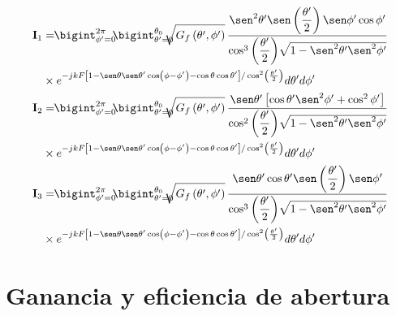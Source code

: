 \begin{subequations}
\label{grup_ec_principios:11}
\begin{align}
\begin{split}
\mathbf{I}_1 &= \!\!\bigint_{\phi ' = 0}^{2\pi}\!\!\bigint_{\theta ' = 0}^{\theta_0}\!\!\!\!\!\sqrt{G_f\left(\theta ',\phi '\right)}\,\dfrac{\sen^2\theta '\sen\left(\dfrac{\theta '}{2}\right)\sen\phi '\cos\phi '}{\cos^3\left(\dfrac{\theta '}{2}\right)\!\sqrt{1 - \sen^2\theta '\sen^2\phi '}}\\
&\times e^{-jkF\left[1 - \sen\theta\sen\theta '\cos\left(\phi - \phi '\right) - \cos\theta\cos\theta '\right]/\cos^2\left(\frac{\theta '}{2}\right)}d\theta 'd\phi '
\end{split}
\label{ec_principios:54}\\
\begin{split}
\mathbf{I}_2 &= \!\!\bigint_{\phi ' = 0}^{2\pi}\!\!\bigint_{\theta ' = 0}^{\theta_0}\!\!\!\!\!\sqrt{G_f\left(\theta ',\phi '\right)}\,\dfrac{\sen\theta '\left[\cos\theta '\sen^2\phi ' + \cos^2\phi '\right]}{\cos^2\left(\dfrac{\theta '}{2}\right)\!\sqrt{1 - \sen^2\theta '\sen^2\phi '}}\\
&\times e^{-jkF\left[1 - \sen\theta\sen\theta '\cos\left(\phi - \phi '\right) - \cos\theta\cos\theta '\right]/\cos^2\left(\frac{\theta '}{2}\right)}d\theta 'd\phi '
\end{split}
\label{ec_principios:55}\\
\begin{split}
\mathbf{I}_3 &= \!\!\bigint_{\phi ' = 0}^{2\pi}\!\!\bigint_{\theta ' = 0}^{\theta_0}\!\!\!\!\!\sqrt{G_f\left(\theta ',\phi '\right)}\,\dfrac{\sen\theta '\cos\theta '\sen\left(\dfrac{\theta '}{2}\right)\sen\phi '}{\cos^3\left(\dfrac{\theta '}{2}\right)\!\sqrt{1 - \sen^2\theta '\sen^2\phi '}}\\
&\times e^{-jkF\left[1 - \sen\theta\sen\theta '\cos\left(\phi - \phi '\right) - \cos\theta\cos\theta '\right]/\cos^2\left(\frac{\theta '}{2}\right)}d\theta 'd\phi '
\end{split}
\label{ec_principios:56}
\end{align}
\end{subequations}

\section{Ganancia y eficiencia de abertura}
\label{sec_principios_gan_ef_abertura}

